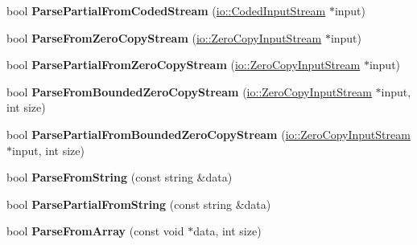 \begin{DoxyCompactItemize}
bool {\bfseries Parse\+Partial\+From\+Coded\+Stream} (\hyperlink{classgoogle_1_1protobuf_1_1io_1_1CodedInputStream}{io\+::\+Coded\+Input\+Stream} $\ast$input)
\item 
\mbox{\label{classgoogle_1_1protobuf_1_1MessageLite_aac1193529df604ebb1a3100e39ae7f41}} 
bool {\bfseries Parse\+From\+Zero\+Copy\+Stream} (\hyperlink{classgoogle_1_1protobuf_1_1io_1_1ZeroCopyInputStream}{io\+::\+Zero\+Copy\+Input\+Stream} $\ast$input)
\item 
\mbox{\label{classgoogle_1_1protobuf_1_1MessageLite_ad73f03a053d00de0b4fb2fd7f22b5f3b}} 
bool {\bfseries Parse\+Partial\+From\+Zero\+Copy\+Stream} (\hyperlink{classgoogle_1_1protobuf_1_1io_1_1ZeroCopyInputStream}{io\+::\+Zero\+Copy\+Input\+Stream} $\ast$input)
\item 
\mbox{\label{classgoogle_1_1protobuf_1_1MessageLite_abf08f7031bab8fcf26814b8aebb2e3b5}} 
bool {\bfseries Parse\+From\+Bounded\+Zero\+Copy\+Stream} (\hyperlink{classgoogle_1_1protobuf_1_1io_1_1ZeroCopyInputStream}{io\+::\+Zero\+Copy\+Input\+Stream} $\ast$input, int size)
\item 
\mbox{\label{classgoogle_1_1protobuf_1_1MessageLite_a364e8a355fc09b042c5c58b1dd2f1631}} 
bool {\bfseries Parse\+Partial\+From\+Bounded\+Zero\+Copy\+Stream} (\hyperlink{classgoogle_1_1protobuf_1_1io_1_1ZeroCopyInputStream}{io\+::\+Zero\+Copy\+Input\+Stream} $\ast$input, int size)
\item 
\mbox{\label{classgoogle_1_1protobuf_1_1MessageLite_a52e87e23c34396217a8b07aca213f0a8}} 
bool {\bfseries Parse\+From\+String} (const string \&data)
\item 
\mbox{\label{classgoogle_1_1protobuf_1_1MessageLite_a732c6d389ede422f0fb402734ffedcb7}} 
bool {\bfseries Parse\+Partial\+From\+String} (const string \&data)
\item 
\mbox{\label{classgoogle_1_1protobuf_1_1MessageLite_abe51451e1018838c8ccc353c20cdf73c}} 
bool {\bfseries Parse\+From\+Array} (const void $\ast$data, int size)

\end{DoxyCompactItemize}
